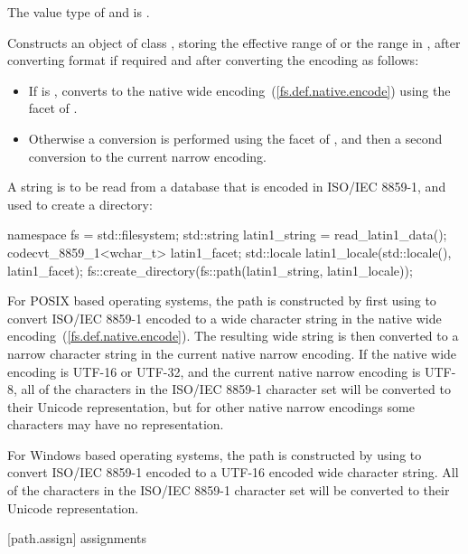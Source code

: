 \begin{itemdescr}
\pnum
\requires
The value type of  and  is
.

\pnum
\effects Constructs an object of class ,
storing the effective range of 
or the range  in ,
after converting format if required and after converting the encoding as
follows:
\begin{itemize}
\item
If  is , converts to the native
wide encoding~(\ref{fs.def.native.encode}) using the 
facet of .
\item
Otherwise a conversion is performed using the
 facet of , and then a second
conversion to the current narrow encoding.
\end{itemize}
\enterexample
A string is to be read from a database
that is encoded in ISO/IEC 8859-1, and used to create a directory:
\begin{codeblock}
namespace fs = std::filesystem;
std::string latin1_string = read_latin1_data();
codecvt_8859_1<wchar_t> latin1_facet;
std::locale latin1_locale(std::locale(), latin1_facet);
fs::create_directory(fs::path(latin1_string, latin1_locale));
\end{codeblock}
For POSIX based operating systems, the path is constructed by first using
 to convert ISO/IEC 8859-1 encoded
 to a wide character string in the native wide
encoding~(\ref{fs.def.native.encode}). The resulting wide string is then
converted to a narrow character
 string in the current native narrow encoding. If the
native wide encoding is UTF-16 or UTF-32, and the current native narrow
encoding is UTF-8, all of the characters in the ISO/IEC 8859-1 character set
will be converted to their Unicode representation, but for other native
narrow encodings some characters may have no representation.

For Windows based operating systems, the path is constructed by
using  to convert ISO/IEC 8859-1 encoded
 to a UTF-16 encoded wide character 
string. All of the characters in the ISO/IEC 8859-1 character set will be
converted to their Unicode representation.
\exitexample
\end{itemdescr}

[path.assign]{ assignments}

